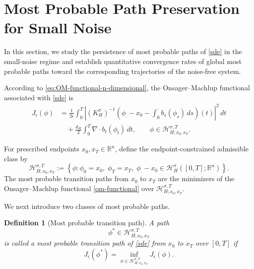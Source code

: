 \documentclass[preprint,12pt]{elsarticle}
\newtheorem{definition}[theorem]{Definition}
\theoremstyle{definition}
\theoremstyle{plain}
\begin{document}
\section{Most Probable Path Preservation for Small Noise}
\label{sec:most probable transition path}

In this section, we study the persistence of most probable paths of
\eqref{sde} in the small-noise regime and establish quantitative
convergence rates of global most probable paths toward the
corresponding trajectories of the noise-free system.


    According to \eqref{eq:OM-functional-n-dimensional}, the
Onsager--Machlup functional associated with \eqref{sde} is
\begin{equation}
\label{om-functional}
\begin{aligned}
    J_\epsilon(\phi)
    &=
    \frac{1}{2\epsilon}
    \int_0^T
    \left|
        (K_H^\sigma)^{-1}
        \left(
            \phi_\cdot-x_0
            -
            \int_0^\cdot b_s(\phi_s)\,ds
        \right)(t)
    \right|^2\,dt
    \\
    &\quad+
    \frac{d_H}{2}
    \int_0^T
    \nabla\!\cdot b_t(\phi_t)\,dt,
    \qquad
    \phi\in\mathcal H_{H;x_0,x_T}^{\sigma,T}.
\end{aligned}
\end{equation}




For prescribed endpoints $x_0,x_T\in\mathbb R^n$, define the
endpoint-constrained admissible class by
\begin{equation*}
    \mathcal H_{H;x_0,x_T}^{\sigma,T}
    :=
    \left\{
        \phi:
        \phi_0=x_0,\;
        \phi_T=x_T,\;
        \phi_\cdot-x_0
        \in
        \mathcal H_H^\sigma([0,T];\mathbb R^n)
    \right\}.
\end{equation*}
The most probable transition paths from $x_0$ to $x_T$ are the
minimizers of the Onsager--Machlup functional
\eqref{om-functional} over
$\mathcal H_{H;x_0,x_T}^{\sigma,T}$.

We next introduce two classes of most probable paths.

\begin{definition}[Most probable transition path]
\label{def:most-probable-transition-path}
A path
\begin{equation*}
    \phi^*
    \in
    \mathcal H_{H;x_0,x_T}^{\sigma,T}
\end{equation*}
is called a most probable transition path of \eqref{sde} from $x_0$ to
$x_T$ over $[0,T]$ if
\begin{equation*}
    J_\epsilon(\phi^*)
    =
    \inf_{\phi\in\mathcal H_{H;x_0,x_T}^{\sigma,T}}
    J_\epsilon(\phi).
\end{equation*}
\end{definition}
\end{document}
